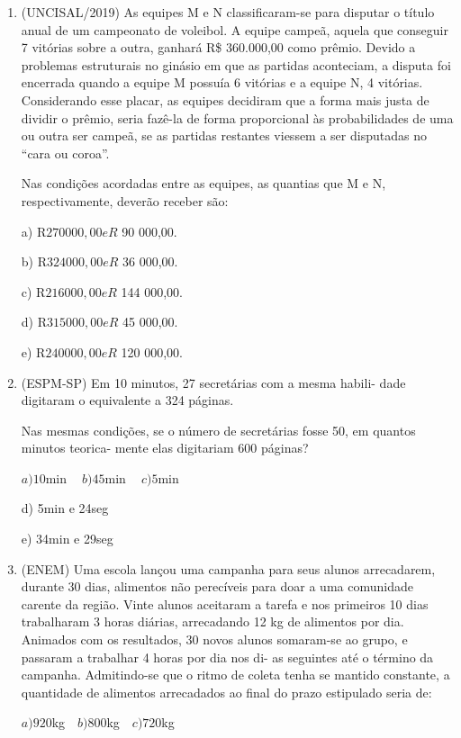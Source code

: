 \begin{multicols*}{2}
	\begin{enumerate}
	
	\item (UNCISAL/2019) As equipes M e N classificaram-se para disputar o título anual de um campeonato de voleibol. A equipe campeã, aquela que conseguir 7 vitórias sobre a outra, ganhará R\$ 360.000,00 como prêmio. Devido a problemas estruturais no ginásio em que as partidas aconteciam, a disputa foi encerrada quando a equipe M possuía 6 vitórias e a equipe N, 4 vitórias. Considerando esse placar, as equipes decidiram que a forma mais justa de dividir o prêmio, seria fazê-la de forma proporcional às probabilidades de uma ou outra ser campeã, se as partidas restantes viessem a ser disputadas no “cara ou coroa”.
	
Nas condições acordadas entre as equipes, as quantias que M e N, respectivamente, deverão receber são:

a)	  R$ 270 000,00 e R$ 90 000,00.

b)	  R$ 324 000,00 e R$ 36 000,00.

c)	  R$ 216 000,00 e R$ 144 000,00.

d)	  R$ 315 000,00 e R$ 45 000,00.

e)	  R$ 240 000,00 e R$ 120 000,00.

	\item (ESPM-SP) Em 10 minutos, 27 secretárias com a mesma habili- dade digitaram o equivalente a 324 páginas. 
	
	Nas mesmas condições, se o número de secretárias fosse 50, em quantos minutos teorica- mente elas digitariam 600 páginas?

$ a) 10$min $\ \ \ \ b) 45$min $\ \ \ \ c) 5$min

d) 5min e 24seg

e) 34min e 29seg

	\item (ENEM) Uma escola lançou uma campanha para seus alunos arrecadarem, durante 30 dias, alimentos não perecíveis para doar a uma comunidade carente da região. Vinte alunos aceitaram a tarefa e nos primeiros 10 dias trabalharam 3 horas diárias, arrecadando 12 kg de alimentos por dia. Animados com os resultados, 30 novos alunos somaram-se ao grupo, e passaram a trabalhar 4 horas por dia nos di- as seguintes até o término da campanha. Admitindo-se que o ritmo de coleta tenha se mantido constante, a quantidade de alimentos arrecadados ao final do prazo estipulado seria de:

$a)920$kg $ \ \ \ b)800$kg $ \ \ \ c)720$kg


\end{enumerate}
\end{multicols*}
